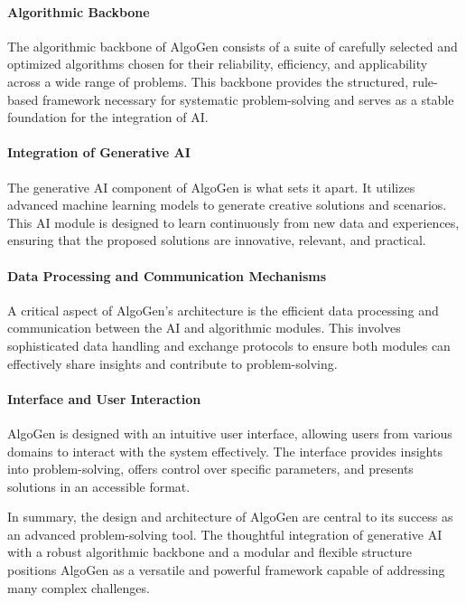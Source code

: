\documentclass{article}
\begin{document}
\paragraph{Algorithmic Backbone}
The algorithmic backbone of AlgoGen consists of a suite of carefully selected and optimized algorithms chosen for their reliability, efficiency, and applicability across a wide range of problems. This backbone provides the structured, rule-based framework necessary for systematic problem-solving and serves as a stable foundation for the integration of AI.

\paragraph{Integration of Generative AI}
The generative AI component of AlgoGen is what sets it apart. It utilizes advanced machine learning models to generate creative solutions and scenarios. This AI module is designed to learn continuously from new data and experiences, ensuring that the proposed solutions are innovative, relevant, and practical.

\paragraph{Data Processing and Communication Mechanisms}
A critical aspect of AlgoGen’s architecture is the efficient data processing and communication between the AI and algorithmic modules. This involves sophisticated data handling and exchange protocols to ensure both modules can effectively share insights and contribute to problem-solving.

\paragraph{Interface and User Interaction}
AlgoGen is designed with an intuitive user interface, allowing users from various domains to interact with the system effectively. The interface provides insights into problem-solving, offers control over specific parameters, and presents solutions in an accessible format.

In summary, the design and architecture of AlgoGen are central to its success as an advanced problem-solving tool. The thoughtful integration of generative AI with a robust algorithmic backbone and a modular and flexible structure positions AlgoGen as a versatile and powerful framework capable of addressing many complex challenges.
\end{document}
